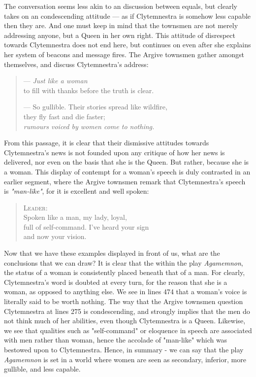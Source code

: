 \noindent
The conversation seems less akin to an discussion between equals, but clearly
takes on an condescending attitude --- as if Clytemnestra is somehow less
capable then they are. And one must keep in mind that the townsmen are
not merely addressing anyone, but a Queen in her own right. This attitude of
disrespect towards Clytemnestra does not end here, but continues on even after
she explains her system of beacons and message fires. The Argive townsmen gather
amongst themselves, and discuss Clytemnestra's address:

\begin{quote}
  --- \emph{Just like a woman} \\
  to fill with thanks before the truth is clear.

  --- So gullible. Their stories spread like wildfire, \\
  they fly fast and die faster; \\
  \emph{rumours voiced by women come to nothing.}

  \autocite[474]{fagles}
\end{quote}

\noindent
From this passage, it is clear that their dismissive attitudes towards
Clytemnestra's news is not founded upon any critique of how her news is
delivered, nor even on the basis that she is the Queen. But rather, because she
is a woman. This display of contempt for a woman's speech is duly contrasted in
an earlier segment, where the Argive townsmen remark that Clytemnestra's
speech is \emph{"man-like"}, for it is excellent and well spoken:

\begin{quote}
  \textsc{Leader}: \\
  Spoken like a man, my lady, loyal, \\
  full of self-command. I've heard your sign \\
  and now your vision.

  \autocite[355]{fagles}
\end{quote}

Now that we have these examples displayed in front of us, what are the
conclusions that we can draw? It is clear that the within the play
\emph{Agamemnon}, the status of a woman is consistently placed beneath that of a
man. For clearly, Clytemnestra's word is doubted at every turn, for the reason
that she is a woman, as opposed to anything else. We see in lines 474 that a
woman's voice is literally said to be worth nothing. The way that the Argive
townsmen question Clytemnestra at lines 275 is condescending, and strongly
implies that the men do not think much of her abilities, even though
Clytemnestra is a Queen. Likewise, we see that qualities such as "self-command"
or eloquence in speech are associated with men rather than woman, hence the
accolade of "man-like" which was bestowed upon to Clytemnestra. Hence, in
summary - we can say that the play \emph{Agamemnon} is set in a world where
women are seen as secondary, inferior, more gullible, and less capable.


